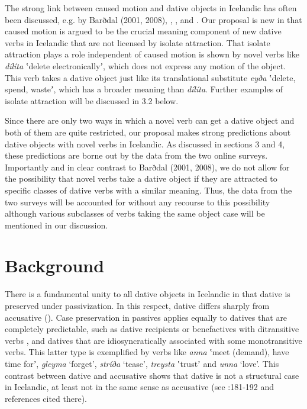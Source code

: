 \documentclass[output=paper,modfonts,nonflat]{langsci/langscibook}
\begin{document}
The strong link between caused motion and dative objects in Icelandic has often been discussed, e.g. by Barðdal (2001, 2008), \citet{Svenonius2002}, \citet{Maling2002}, and \citet{Jónsson2013a}. Our proposal is new in that caused motion is argued to be the crucial meaning component of new dative verbs in Icelandic that are not licensed by isolate attraction. That isolate attraction plays a role independent of caused motion is shown by novel verbs like \textit{dílíta} ʽdelete electronicallyʼ, which does not express any motion of the object. This verb takes a dative object just like its translational substitute \textit{eyða} ʽdelete, spend, wasteʼ, which has a broader meaning than \textit{dílíta}. Further examples of isolate attraction will be discussed in 3.2 below.

Since there are only two ways in which a novel verb can get a dative object and both of them are quite restricted, our proposal makes strong predictions about dative objects with novel verbs in Icelandic. As discussed in sections 3 and 4, these predictions are borne out by the data from the two online surveys. Importantly and in clear contrast to Barðdal (2001, 2008), we do not allow for the possibility that novel verbs take a dative object if they are attracted to specific classes of dative verbs with a similar meaning. Thus, the data from the two surveys will be accounted for without any recourse to this possibility although various subclasses of verbs taking the same object case will be mentioned in our discussion.

\section{Background} %

There is a fundamental unity to all dative objects in Icelandic in that dative is preserved under passivization. In this respect, dative differs sharply from accusative (\citealt{ZaenenMalingThráinsson1985}). Case preservation in passives applies equally to datives that are completely predictable, such as dative recipients or benefactives with ditransitive verbs \citep{Jónsson2000}, and datives that are idiosyncratically associated with some monotransitive verbs. This latter type is exemplified by verbs like \textit{anna} ʽmeet (demand), have time forʼ, \textit{gleyma} ‘forget’, \textit{stríða} ‘tease’, \textit{treysta} ʽtrustʼ and \textit{unna} ‘love’. This contrast between dative and accusative shows that dative is not a structural case in Icelandic, at least not in the same sense as accusative (see \citealt{Thráinsson2007}:181-192 and references cited there).
\end{document}
